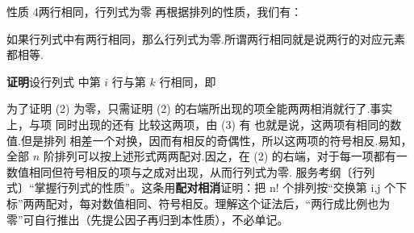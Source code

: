 \begin{fdeep}{性质 4\quad 两行相同，行列式为零}
再根据排列的性质，我们有：

\quad 如果行列式中有两行相同，那么行列式为零.所谓两行相同就是说两行的对应元素都相等.

\textbf{证明}\quad 设行列式
中第 $i$ 行与第 $k$ 行相同，即

为了证明 (2) 为零，只需证明 (2) 的右端所出现的项全能两两相消就行了.事实上，与项
同时出现的还有
比较这两项，由 (3) 有
也就是说，这两项有相同的数值.但是排列
相差一个对换，因而有相反的奇偶性，所以这两项的符号相反.易知，全部 $n$ 阶排列可以按上述形式两两配对.因之，在 (2) 的右端，对于每一项都有一数值相同但符号相反的项与之成对出现，从而行列式为零.
\fbref{}服务考纲〔行列式〕“掌握行列式的性质”。这条用\textbf{配对相消}证明：把 n! 个排列按“交换第 i,j 个下标”两两配对，每对数值相同、符号相反。理解这个证法后，“两行成比例也为零”可自行推出（先提公因子再归到本性质），不必单记。
\end{fdeep}

